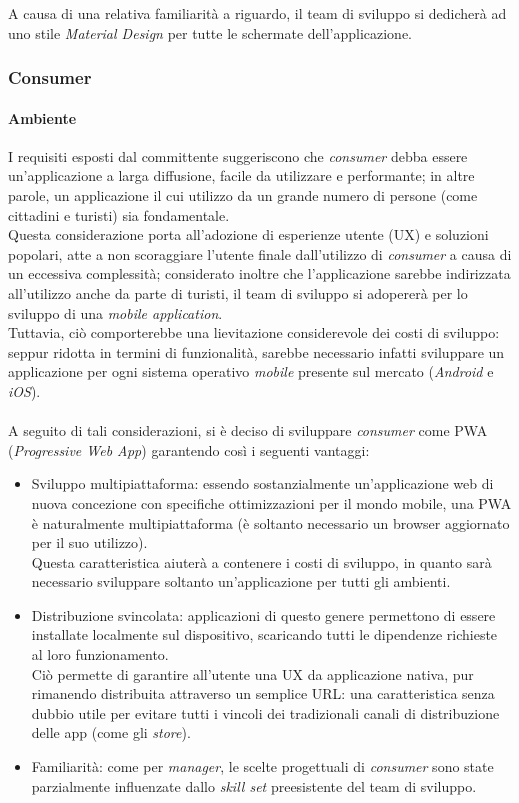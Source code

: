 \documentclass[12pt]{article}
\begin{document}
A causa di una relativa familiarità a riguardo, il team di sviluppo si dedicherà ad uno stile \textit{Material Design} per tutte le schermate dell'applicazione.
\newpage
\subsubsection{Consumer}
\paragraph{Ambiente}
I requisiti esposti dal committente suggeriscono che \textit{consumer} debba essere un'applicazione a larga diffusione, facile da utilizzare e performante; in altre parole, un applicazione il cui utilizzo da un grande numero di persone (come cittadini e turisti) sia fondamentale.\\
Questa considerazione porta all'adozione di esperienze utente (UX) e soluzioni popolari, atte a non scoraggiare l'utente finale dall'utilizzo di \textit{consumer} a causa di un eccessiva complessità; considerato inoltre che l'applicazione sarebbe indirizzata all'utilizzo anche da parte di turisti, il team di sviluppo si adopererà per lo sviluppo di una \textit{mobile application}.\\
Tuttavia, ciò comporterebbe una lievitazione considerevole dei costi di sviluppo: seppur ridotta in termini di funzionalità, sarebbe necessario infatti sviluppare un applicazione per ogni sistema operativo \textit{mobile} presente sul mercato (\textit{Android} e \textit{iOS}).\\\\
A seguito di tali considerazioni, si è deciso di sviluppare \textit{consumer} come PWA (\textit{Progressive Web App}) garantendo così i seguenti vantaggi:
\begin{itemize}
\item Sviluppo multipiattaforma: essendo sostanzialmente un'applicazione web di nuova concezione con specifiche ottimizzazioni per il mondo mobile, una PWA è naturalmente multipiattaforma (è soltanto necessario un browser aggiornato per il suo utilizzo).\\
Questa caratteristica aiuterà a contenere i costi di sviluppo, in quanto sarà necessario sviluppare soltanto un'applicazione per tutti gli ambienti.
\item Distribuzione svincolata: applicazioni di questo genere permettono di essere installate localmente sul dispositivo, scaricando tutti le dipendenze richieste al loro funzionamento.\\%
Ciò permette di garantire all'utente una UX da applicazione nativa, pur rimanendo distribuita attraverso un semplice URL: una caratteristica senza dubbio utile per evitare tutti i vincoli dei tradizionali canali di distribuzione delle app (come gli \textit{store}).
\item Familiarità: come per \textit{manager}, le scelte progettuali di \textit{consumer} sono state parzialmente influenzate dallo \textit{skill set} preesistente del team di sviluppo. 
\end{itemize}
\end{document}
